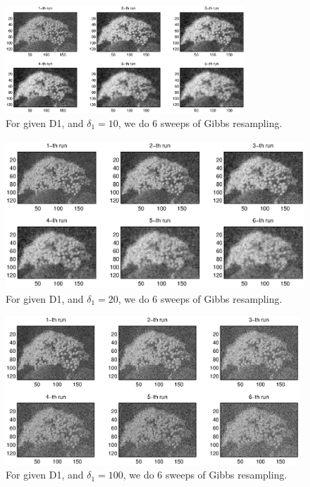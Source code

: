 \documentclass[11pt] {article}
\begin{document}
\begin{figure}
\begin{center}

\includegraphics[width=0.8\textwidth]{D1_d1.eps}

\end{center}
\caption{For given D1, and $\delta_1=10$, we do 6 sweeps of Gibbs resampling.}
\label{fig:D1_d1}
\end{figure}

\begin{figure}
\begin{center}

\includegraphics[height=2.2in]{D1_d2.eps}

\end{center}
\caption{For given D1, and $\delta_1=20$, we do 6 sweeps of Gibbs resampling.}
\label{fig:D1_d2}
\end{figure}

\begin{figure}
\begin{center}

\includegraphics[height=2.2in]{D1_d3.eps}

\end{center}
\caption{For given D1, and $\delta_1=100$, we do 6 sweeps of Gibbs resampling.}
\label{fig:D1_d3}
\end{figure}
\end{document}
